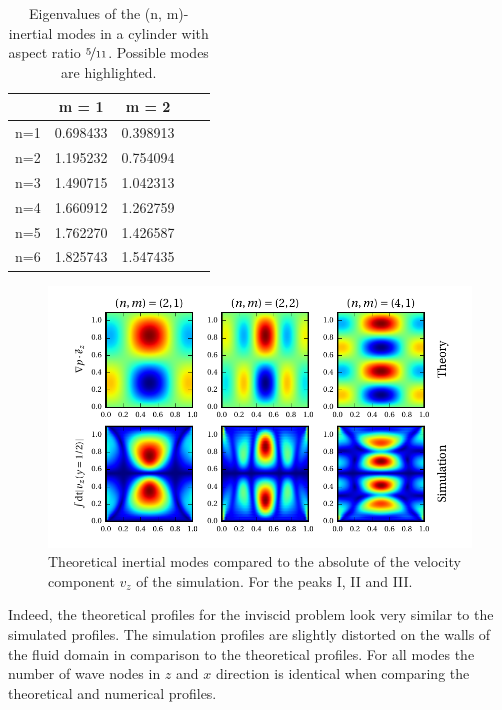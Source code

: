 \bgroup\large
\begin{table}[!b]
\centering
\def\arraystretch{1.5}%
\begin{tabular}{c c c c c}\toprule
            &    m =  1  & m = 2   &    \\ \hline
\midrule
        n=1 &   0.698433         &              0.398913 &    \\
        n=2 & \cellcolor{blue!25}  1.195232         &        \cellcolor{blue!25}      0.754094 &    \\
        n=3 &   1.490715         &              1.042313 &    \\
        n=4 &  \cellcolor{blue!25} 1.660912         &     \cellcolor{blue!25}         1.262759 &    \\
        n=5 &   1.762270         &              1.426587 &    \\
        n=6 &   1.825743         &              1.547435 &    \\ \hline

\bottomrule
\end{tabular}
\caption{Eigenvalues of the (n, m)-inertial modes in a cylinder with aspect ratio $\nicefrac{5}{11}$.
            Possible modes are highlighted.  \label{cone_cyleigenvalues} }
\end{table}
\egroup
\clearpage


\begin{figure}[!t]
  \centering
  \includegraphics{gfx/cone/cylinder/modes.pdf}  \caption{
      Theoretical inertial modes compared to the absolute of the velocity component $v_z$ of the simulation.
      For the peaks \RN{1}, \RN{2} and \RN{3}.
      \label{cone:cyl_modes}}
\end{figure}

Indeed, the theoretical profiles for the inviscid problem look very similar to the simulated profiles.
The simulation profiles are slightly distorted on the walls of the fluid domain in
comparison to the theoretical profiles.
For all modes the number of wave nodes in $z$ and $x$ direction is identical
when comparing the theoretical and numerical profiles.

